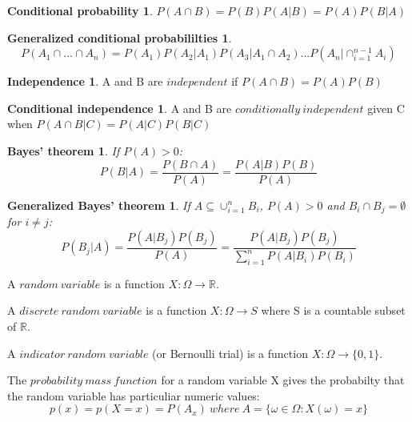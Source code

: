 \documentclass{article}
\begin{document}
\theoremstyle{definition}
\newtheorem*{cprob}{Conditional probability}
\begin{cprob}
\( P(A \cap B) = P(B)P(A|B) = P(A)P(B|A) \)
\end{cprob}

\theoremstyle{plain}
\newtheorem*{gcprob}{Generalized conditional probabililties}
\begin{gcprob}
\[
    P(A_1 \cap ... \cap A_n) = P(A_1)P(A_2|A_1)P(A_3|A_1 \cap A_2)...P(A_n|\cap_{i=1}^{n-1}A_i)
\]
\end{gcprob}

\theoremstyle{definition}
\newtheorem*{indep}{Independence}
\begin{indep}
A and B are $independent$ if \( P(A \cap B) = P(A)P(B) \)
\end{indep}

\theoremstyle{definition}
\newtheorem*{cindep}{Conditional independence}
\begin{cindep}
A and B are $conditionally\ independent$ given C when \( P(A \cap B|C) = P(A|C)P(B|C) \)
\end{cindep}

\theoremstyle{plain}
\newtheorem*{bayes}{Bayes' theorem}
\begin{bayes}
If $P(A) > 0$:
\[
    P(B|A) = \frac{P(B \cap A)}{P(A)} = \frac{P(A|B)P(B)}{P(A)}
\]
\end{bayes}

\theoremstyle{plain}
\newtheorem*{gbayes}{Generalized Bayes' theorem}
\begin{gbayes}
If $A \subseteq \cup_{i=1}^n B_i$, $P(A) > 0$ and $B_i \cap B_j = \emptyset$ for $i \neq j$:
\[
    P(B_j|A) = \frac{P(A|B_j)P(B_j)}{P(A)} = \frac{P(A|B_j)P(B_j)}{\sum_{i=1}^n P(A|B_i)P(B_i)}
\]
\end{gbayes}

A $random\ variable$ is a function \( X: \Omega \rightarrow \mathbb{R} \).

A $discrete\ random\ variable$ is a function \( X: \Omega \rightarrow S \) where S is a countable subset of $\mathbb{R}$.

A $indicator\ random\ variable$ (or Bernoulli trial) is a function \( X: \Omega \rightarrow \{0,1\} \).

The $probability\ mass\ function$ for a random variable X gives the probabilty that the random variable has particuliar numeric values:
\[
    p(x) = p(X=x) = P(A_x) \ where \ A = \{\omega \in \Omega : X(\omega) = x\}
\]
\end{document}
